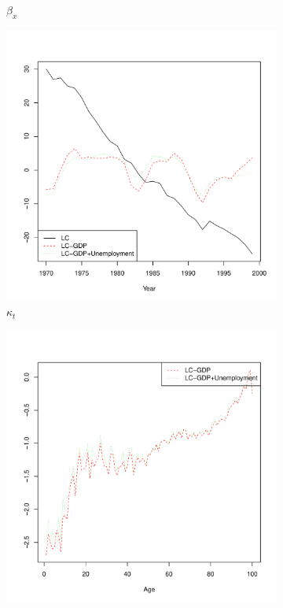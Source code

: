 \documentclass[AER, draftmode]{AEA}
\begin{document}
\begin{figure}[!htp]
\begin{subfigure}{0.4\textwidth}
		\caption{$\beta_x$}
		\label{fig:femaleb}  
	\end{subfigure}
	\begin{subfigure}{0.4\textwidth}
		\includegraphics[width=\linewidth]{CAN_kt_female}
		\caption{$\kappa_t$}
		\label{fig:femalec} 
	\end{subfigure}
	\begin{subfigure}{0.4\textwidth}
		\includegraphics[width=\linewidth]{CAN_g1x_female}

\end{subfigure}
\end{figure}
\end{document}
